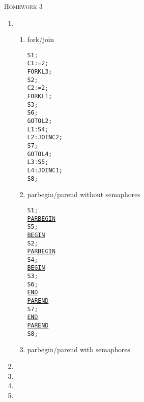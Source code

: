 \documentclass{article}
\begin{document}
\begin{center}
    \textsc{\Large Homework 3}\\
\end{center}


\begin{enumerate}
\item
  \begin{enumerate}    
  \item fork/join
\begin{alltt}
    S1;
    C1 := 2;
    FORK L3;
    S2;
    C2 := 2;
    FORK L1;
    S3;
    S6;
    GOTO L2;
L1: S4;
L2: JOIN C2;
    S7;
    GOTO L4;
L3: S5;
L4: JOIN C1;
    S8;
\end{alltt}
    \item parbegin/parend without semaphores
\begin{alltt}
S1;
\underline{PARBEGIN}
  S5;
  \underline{BEGIN}
    S2;
    \underline{PARBEGIN}
      S4;
      \underline{BEGIN}
        S3;
        S6;
      \underline{END}
    \underline{PAREND}
    S7;
  \underline{END}
\underline{PAREND}
S8;
\end{alltt}
    \item parbegin/parend with semaphores
  \end{enumerate}
\item
\item
\item
\item 

\end{enumerate}
\end{document}
